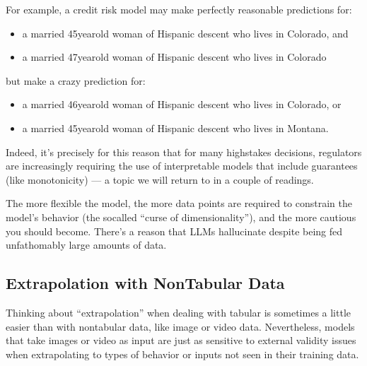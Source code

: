 \documentclass[letterpaper,10pt,english]{jupyterBook}
\begin{document}
\sphinxAtStartPar
For example, a credit risk model may make perfectly reasonable predictions for:
\begin{itemize}
\item {} 
\sphinxAtStartPar
a married 45\sphinxhyphen{}year\sphinxhyphen{}old woman of Hispanic descent who lives in Colorado, and

\item {} 
\sphinxAtStartPar
a married 47\sphinxhyphen{}year\sphinxhyphen{}old woman of Hispanic descent who lives in Colorado

\end{itemize}

\sphinxAtStartPar
but make a crazy prediction for:
\begin{itemize}
\item {} 
\sphinxAtStartPar
a married 46\sphinxhyphen{}year\sphinxhyphen{}old woman of Hispanic descent who lives in Colorado, or

\item {} 
\sphinxAtStartPar
a married 45\sphinxhyphen{}year\sphinxhyphen{}old woman of Hispanic descent who lives in Montana.

\end{itemize}

\sphinxAtStartPar
Indeed, it’s precisely for this reason that for many high\sphinxhyphen{}stakes decisions, regulators are increasingly requiring the use of interpretable models that include guarantees (like monotonicity) — a topic we will return to in a couple of readings.

\sphinxAtStartPar
The more flexible the model, the more data points are required to constrain the model’s behavior (the so\sphinxhyphen{}called “curse of dimensionality”), and the more cautious you should become. There’s a reason that LLMs hallucinate despite being fed unfathomably large amounts of data.


\subsection{Extrapolation with Non\sphinxhyphen{}Tabular Data}
\label{\detokenize{30_questions/27_passive_external_general:extrapolation-with-non-tabular-data}}
\sphinxAtStartPar
Thinking about “extrapolation” when dealing with tabular is sometimes a little easier than with non\sphinxhyphen{}tabular data, like image or video data. Nevertheless, models that take images or video as input are just as sensitive to external validity issues when extrapolating to types of behavior or inputs not seen in their training data.
\end{document}
